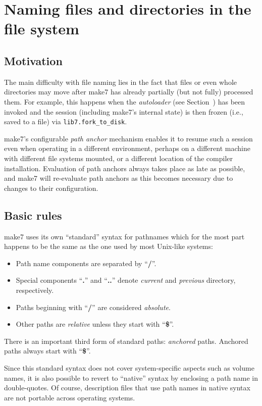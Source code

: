 
\section{Naming files and directories in the file system}

\subsection{Motivation}

The main difficulty with file naming lies in the fact that files or
even whole directories may move after make7 has already partially (but
not fully) processed them.  For example, this happens when the {\em
autoloader} (see Section~) has been invoked and the
session (including make7's internal state) is then frozen (i.e., saved to
a file) via {\tt lib7.fork_to_disk}.

make7's configurable {\em path anchor} mechanism enables it to resume
such a session even when operating in a different environment, perhaps
on a different machine with different file systems mounted, or a
different location of the compiler installation.  Evaluation of path
anchors always takes place as late as possible, and make7 will re-evaluate
path anchors as this becomes necessary due to changes to their
configuration.

\subsection{Basic rules}
\label{sec:basicrules}

make7 uses its own ``standard'' syntax for pathnames which for the most
part happens to be the same as the one used by most Unix-like systems:
\begin{itemize}
\item Path name components are separated by ``{\bf /}''.
\item Special components ``{\bf .}'' and ``{\bf ..}'' denote {\em
current} and {\em previous} directory, respectively.
\item Paths beginning
with ``{\bf /}'' are considered {\em absolute}.
\item Other paths are {\em relative} unless they start with ``{\bf \$}''.
\end{itemize}
\noindent There is an important third form of standard paths: {\em
anchored} paths.  Anchored paths always start with ``{\bf \$}''.

Since this standard syntax does not cover system-specific aspects such
as volume names, it is also possible to revert to ``native'' syntax by
enclosing a path name in double-quotes.  Of course, description files
that use path names in native syntax are not portable across operating
systems.

